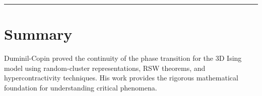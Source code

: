\begin{center}\rule{0.5\linewidth}{0.5pt}\end{center}

\section*{Summary}

Duminil-Copin proved the continuity of the phase transition for the 3D Ising model using random-cluster representations, RSW theorems, and hypercontractivity techniques. His work provides the rigorous mathematical foundation for understanding critical phenomena.
